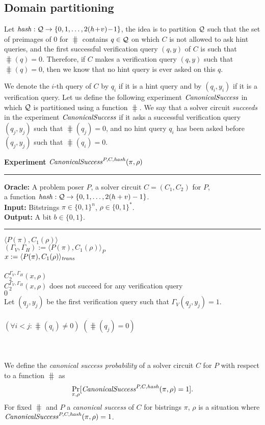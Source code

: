%
\subsection{Domain partitioning}
\label{st:domain_partition}
Let $\operatorname{\mathit{hash}}:\mathcal{Q}\rightarrow\{0,1,\dots, 2(h\!+\!v)\!-\!1\}$, the idea is to partition $\mathcal{Q}$ such that the set of preimages
of $0$ for $\hash$ contains $q \in \mathcal{Q}$ on which $C$ is not allowed to ask hint queries,
and the first successful verification query $(q,y)$ of $C$ is such that $\hash(q) = 0$.
Therefore, if $C$ makes a verification query $(q,y)$ such that $\hash(q) = 0$, then we know that no hint query is ever asked on this $q$.

We denote the $i$-th query of $C$ by $q_i$ if it is a hint query and by $(q_i, y_i)$ if it is a verification query.
Let us define the following experiment $\operatorname{\mathit{CanonicalSuccess}}$ in which $\mathcal{Q}$ is partitioned using a function $\hash$.
We say that a solver circuit \textit{succeeds} in the experiment $\operatorname{\mathit{CanonicalSuccess}}$
if it asks a successful verification query $(q_j, y_j)$ such that $\hash(q_j) = 0$,
and no hint query $q_i$ has been asked before $(q_j, y_j)$ such that $\hash(q_i) = 0$.
%
\begin{codeblock}
  \textbf{Experiment} $\operatorname{\mathit{CanonicalSuccess}}^{P, C, \operatorname{\mathit{hash}}}(\pi, \rho)$
  \medskip \hrule
  \textbf{Oracle:} A problem poser $P$, a solver circuit $C = (C_1, C_2)$ for $P$,\\
  \IndII a function $\operatorname{\mathit{hash}}: \mathcal{Q} \rightarrow \{0, 1, \dotsc, 2(h+v) - 1\}$.\\
  \textbf{Input:}  Bitstrings $\pi \in \{0,1\}^n$, $\rho \in \{0,1\}^*$. \\
  \textbf{Output:} A bit $b \in \{0,1\}$.
  \medskip\hrule
  \Run $\langle P(\pi), C_1(\rho) \rangle$ \\
  \IndI $(\Gamma_V, \Gamma_H) := \langle P(\pi), C_1(\rho) \rangle_{P}$ \\
  \IndI $x := \langle P(\pi), C_1(\rho) \rangle_{\operatorname{\mathit{trans}}}$ \\ \\
  \Run $C_2^{\Gamma_V, \Gamma_H} (x, \rho)$ \\
  \IndI \If $C_2^{\Gamma_V, \Gamma_H} (x, \rho)$ does not succeed for any verification query \Then \\
  \IndII \Return $0$ \\
  \IndI Let $(q_j,y_j)$ be the first verification query such that $\Gamma_V(q_j, y_j) = 1$.\\
  \\
  \If $(\forall i < j :  \hash(q_i) \neq 0)$ \And $(\hash(q_j) = 0)$ \Then \\
  \IndI {}\\
  \Else\\
  \IndI {}
\end{codeblock}
%
We define the \textit{canonical success probability} of a solver circuit $C$ for $P$ with respect to a function $\hash$ as
\begin{align}
 \underset{\pi, \rho}{\Pr}[\operatorname{\mathit{CanonicalSuccess}}^{P, C, \operatorname{\mathit{hash}}}(\pi, \rho) = 1].
\end{align}
%
For fixed $\hash$ and $P$ a \textit{canonical success} of $C$ for bistrings $\pi$, $\rho$ is a situation where
$\operatorname{\mathit{CanonicalSuccess}}^{P, C, \operatorname{\mathit{hash}}}(\pi, \rho) = 1$.

